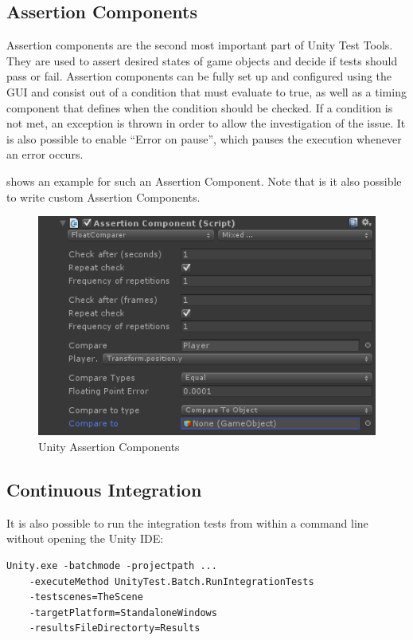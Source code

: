     \subsection{Assertion Components}
        Assertion components are the second most important part of Unity Test Tools. They are used to assert desired states of game objects and decide if tests should pass or fail.
        Assertion components can be fully set up and configured using the GUI and consist out of a condition that must evaluate to true, as well as a timing component that defines when the condition should be checked.
        If a condition is not met, an exception is thrown in order to allow the investigation of the issue. 
        It is also possible to enable ``Error on pause'', which pauses the execution whenever an error occurs.

         shows an example for such an Assertion Component. Note that is it also possible to write custom Assertion Components.


        \begin{figure}[hbtp]
            \centering
            \includegraphics[width=0.95\columnwidth]{img/UnityAssertionComponent.png}
            \caption{Unity Assertion Components}
            \label{fig:AssertionComponents}
        \end{figure}

    \subsection{Continuous Integration}
        It is also possible to run the integration tests from within a command line without opening the Unity IDE:
\begin{lstlisting}
Unity.exe -batchmode -projectpath ...
    -executeMethod UnityTest.Batch.RunIntegrationTests
    -testscenes=TheScene
    -targetPlatform=StandaloneWindows
    -resultsFileDirectorty=Results
\end{lstlisting}

